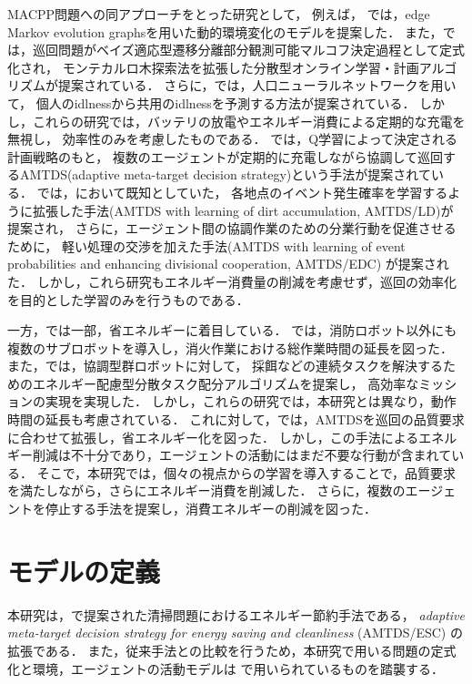 \documentclass[12pt,a4j,twoside]{jarticle}
\begin{document}
MACPP問題への同アプローチをとった研究として，
例えば， \cite{Othmani2017}では，edge Markov evolution graphsを用いた動的環境変化のモデルを提案した．
また，\cite{Zhou2019}では，巡回問題がベイズ適応型遷移分離部分観測可能マルコフ決定過程として定式化され，
モンテカルロ木探索法を拡張した分散型オンライン学習・計画アルゴリズムが提案されている．
さらに，\cite{Othmani2018}では，人口ニューラルネットワークを用いて，
個人のidlnessから共用のidlnessを予測する方法が提案されている．
しかし，これらの研究では，バッテリの放電やエネルギー消費による定期的な充電を無視し，
効率性のみを考慮したものである．
\cite{Yoneda2013}では，Q学習によって決定される計画戦略のもと，
複数のエージェントが定期的に充電しながら協調して巡回するAMTDS(adaptive meta-target decision strategy)という手法が提案されている．
\cite{Sugiyama2015meta}では，\cite{Yoneda2013}において既知としていた，
各地点のイベント発生確率を学習するように拡張した手法(AMTDS with learning of dirt accumulation, AMTDS/LD)が提案され，
さらに，エージェント間の協調作業のための分業行動を促進させるために，
軽い処理の交渉を加えた手法(AMTDS with learning of event probabilities and enhancing divisional cooperation, AMTDS/EDC)
が提案された．
しかし，これら研究もエネルギー消費量の削減を考慮せず，巡回の効率化を目的とした学習のみを行うものである．
\par

一方，\cite{Kim2016,Benkrid2019,Notomista2022,Kim2016,Wu2019,Latif2021}では一部，省エネルギーに着目している．
\cite{Kim2016}では，消防ロボット以外にも複数のサブロボットを導入し，消火作業における総作業時間の延長を図った．
また，\cite{Latif2021}では，協調型群ロボットに対して，
採餌などの連続タスクを解決するためのエネルギー配慮型分散タスク配分アルゴリズムを提案し，
高効率なミッションの実現を実現した．
しかし，これらの研究では，本研究とは異なり，動作時間の延長も考慮されている．
これに対して，\cite{Wu2019}では，AMTDSを巡回の品質要求に合わせて拡張し，省エネルギー化を図った．
しかし，この手法によるエネルギー削減は不十分であり，エージェントの活動にはまだ不要な行動が含まれている．
そこで，本研究では，個々の視点からの学習を導入することで，品質要求を満たしながら，さらにエネルギー消費を削減した．
さらに，複数のエージェントを停止する手法を提案し，消費エネルギーの削減を図った．

\section{モデルの定義}\label{sec:MACPP_model}
本研究は，\cite{Wu2019}で提案された清掃問題におけるエネルギー節約手法である，
{\em adaptive meta-target decision strategy for energy saving and cleanliness} (AMTDS/ESC)
の拡張である．
また，従来手法との比較を行うため，本研究で用いる問題の定式化と環境，エージェントの活動モデルは
\cite{Wu2019}で用いられているものを踏襲する．
\par
\end{document}
